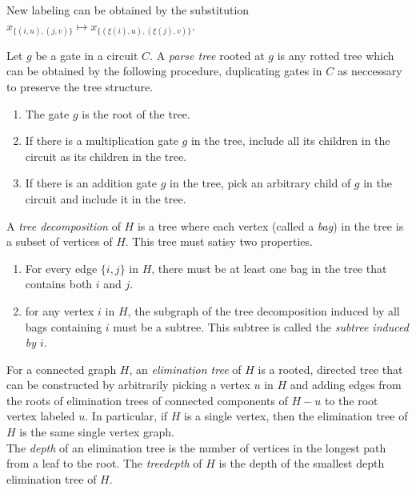 \noindent
New labeling can be obtained by the substitution $x_{\{(i,u),(j,v)\}}\mapsto x_{\{(\xi(i),u),(\xi(j),v)\}}$.

\begin{definition}
    Let $g$ be a gate in a circuit $C$. A \textit{parse tree} rooted at $g$ is any rotted tree which can be obtained by the following procedure, duplicating gates in $C$ as neccessary to preserve the tree structure.
    \begin{enumerate}
        \item The gate $g$ is the root of the tree.
        \item If there is a multiplication gate $g$ in the tree, include all its children in the circuit as its children in the tree.
        \item If there is an addition gate $g$ in the tree, pick an arbitrary child of $g$ in the circuit and include it in the tree.
    \end{enumerate}
\end{definition}

\begin{definition}\label{def:tree-decomposition}
    A \textit{tree decomposition} of $H$ is a tree where each vertex (called a \textit{bag}) in the tree is a subset of vertices of $H$. This tree must satisy two properties.
    \begin{enumerate}
        \item For every edge $\{i,j\}$ in $H$, there must be at least one bag in the tree that contains both $i$ and $j$.
        \item for any vertex $i$ in $H$, the subgraph of the tree decomposition induced by all bags containing $i$ must be a subtree. This subtree is called the \textit{subtree induced by $i$}.
    \end{enumerate}
\end{definition}

\begin{definition}
    For a connected graph $H$, an \textit{elimination tree} of $H$ is a rooted, directed tree that can be constructed by arbitrarily picking a vertex $u$ in $H$ and adding edges from the roots of elimination trees of connected components of $H-u$ to the root vertex labeled $u$. In particular, if $H$ is a single vertex, then the elimination tree of $H$ is the same single vertex graph.\\
    The \textit{depth} of an elimination tree is the number of vertices in the longest path from a leaf to the root. The \textit{treedepth} of $H$ is the depth of the smallest depth elimination tree of $H$.
\end{definition}

